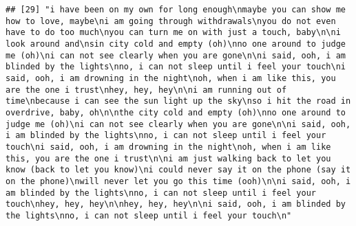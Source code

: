 \documentclass[]{article}
\begin{document}
\begin{verbatim}
## [29] "i have been on my own for long enough\nmaybe you can show me how to love, maybe\ni am going through withdrawals\nyou do not even have to do too much\nyou can turn me on with just a touch, baby\n\ni look around and\nsin city cold and empty (oh)\nno one around to judge me (oh)\ni can not see clearly when you are gone\n\ni said, ooh, i am blinded by the lights\nno, i can not sleep until i feel your touch\ni said, ooh, i am drowning in the night\noh, when i am like this, you are the one i trust\nhey, hey, hey\n\ni am running out of time\nbecause i can see the sun light up the sky\nso i hit the road in overdrive, baby, oh\n\nthe city cold and empty (oh)\nno one around to judge me (oh)\ni can not see clearly when you are gone\n\ni said, ooh, i am blinded by the lights\nno, i can not sleep until i feel your touch\ni said, ooh, i am drowning in the night\noh, when i am like this, you are the one i trust\n\ni am just walking back to let you know (back to let you know)\ni could never say it on the phone (say it on the phone)\nwill never let you go this time (ooh)\n\ni said, ooh, i am blinded by the lights\nno, i can not sleep until i feel your touch\nhey, hey, hey\n\nhey, hey, hey\n\ni said, ooh, i am blinded by the lights\nno, i can not sleep until i feel your touch\n"                                                                                                                                                                                                                                                                                                                                                                                                                                                                                                                                                                                                                                                                                                                                                                                                                                                                                                                                                                                                                                                                                                                                                                                                                                                                                                                                                                                                                                                                                                                                                                                                                                                                                                                                                                                                                                                                                                                                                                                                                                                                                                              
\end{verbatim}
\end{document}
